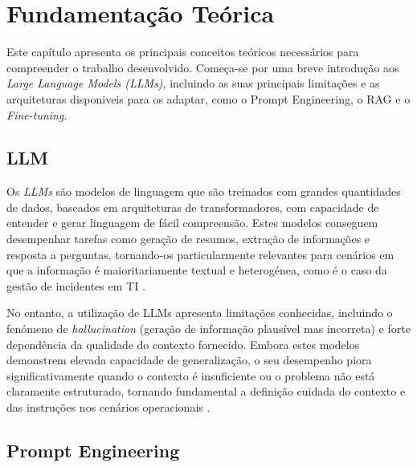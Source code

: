 
\chapter{Fundamentação Teórica} %
\label{chap:Chapter2_0} %


	Este capítulo apresenta os principais conceitos teóricos necessários para compreender o trabalho desenvolvido. Começa-se por uma breve introdução aos \textit{Large Language Models (LLMs)}, incluindo as suas principais limitações e as arquiteturas disponiveis para os adaptar, como o Prompt Engineering, o \gls{RAG} e o \textit{Fine-tuning}.

\section{\gls{LLM}}
	Os \textit{\gls{LLM}s} são modelos de linguagem que são treinados com grandes quantidades de dados, baseados em arquiteturas de transformadores, com capacidade de entender e gerar linguagem de fácil compreensão. Estes modelos conseguem desempenhar tarefas como geração de resumos, extração de informações e resposta a perguntas, tornando-os particularmente relevantes para cenários em que a informação é maioritariamente textual e heterogénea, como é o caso da gestão de incidentes em TI \autocite{Reference4}.
	
	No entanto, a utilização de \gls{LLM}s apresenta limitações conhecidas, incluindo o fenómeno de \textit{hallucination} (geração de informação plausível mas incorreta) e forte dependência da qualidade do contexto fornecido. Embora estes modelos demonstrem elevada capacidade de generalização, o seu desempenho piora significativamente quando o contexto é insuficiente ou o problema não está claramente estruturado, tornando fundamental a definição cuidada do contexto e das instruções nos cenários operacionais \autocite{Reference1}.

\section{Prompt Engineering}
	
